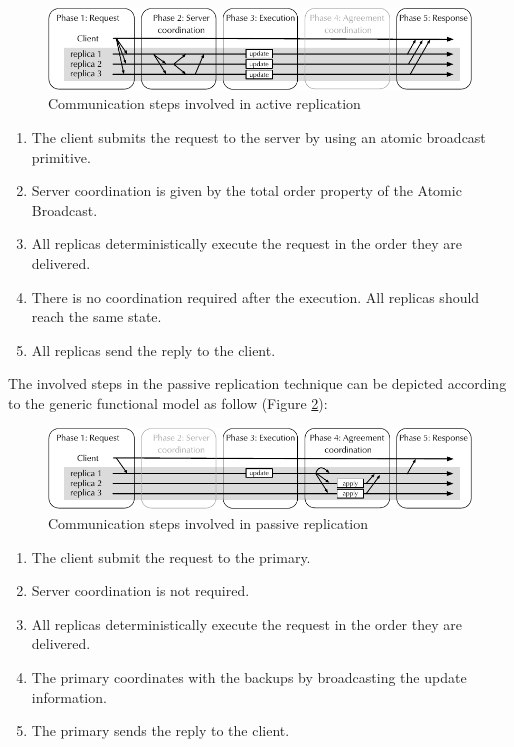 \begin{figure}[ht!]
  \begin{minipage}[b]{1.0\linewidth}
  \centering
        \includegraphics[width=1\linewidth]{figures/replication-active}
  \end{minipage}
  \caption{Communication steps involved in active replication}
  \label{fig:replication:active}
\end{figure}

\begin{enumerate}
  \item The client submits the request to the server by using an atomic
  broadcast primitive.
  \item Server coordination is given by the total order property of the Atomic
  Broadcast.
  \item All replicas deterministically execute the request in the order they are
  delivered.
  \item There is no coordination required after the execution. All replicas
  should reach the same state.
  \item All replicas send the reply to the client.
\end{enumerate}

The involved steps in the passive replication technique can be depicted
according to the generic functional model as follow (Figure
\ref{fig:replication:passive}):

\begin{figure}[ht!]
  \begin{minipage}[b]{1.0\linewidth}
  \centering
        \includegraphics[width=1\linewidth]{figures/replication-passive}
  \end{minipage}
  \caption{Communication steps involved in passive replication}
  \label{fig:replication:passive}
\end{figure}

\begin{enumerate}
  \item The client submit the request to the primary.
  \item Server coordination is not required.
  \item All replicas deterministically execute the request in the order they are
  delivered.
  \item The primary coordinates with the backups by broadcasting the update
  information.
  \item The primary sends the reply to the client.
\end{enumerate}


